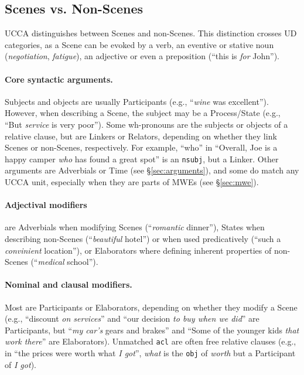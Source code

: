 \documentclass[11pt,a4paper]{article}
\begin{document}
\subsection{Scenes vs. Non-Scenes}\label{sec:s}

UCCA distinguishes between Scenes and non-Scenes.
This distinction crosses UD categories,
as a Scene can be evoked by a verb, an eventive or stative
noun (\textit{negotiation}, \textit{fatigue}),
an adjective or even a preposition (``this is \textit{for} John'').

\paragraph{Core syntactic arguments.}
      Subjects and objects are usually Participants (e.g., ``\textit{wine} was excellent'').
      However, when describing a Scene, the subject may be a Process/State
      (e.g., ``But \textit{service} is very poor'').
      Some wh-pronouns are the subjects or objects of a relative clause, but
      are Linkers or Relators,
      depending on whether they link Scenes or non-Scenes, respectively.
      For example, ``who'' in ``Overall, Joe is a happy camper \textit{who} has found a great spot'' is an \texttt{nsubj}, but a Linker.
      Other arguments are Adverbials or Time (see \S\ref{sec:arguments}), and
      some do match any UCCA unit, especially when they are parts of MWEs (see \S\ref{sec:mwe}).

\paragraph{Adjectival modifiers} are Adverbials when modifying Scenes
    (``\textit{romantic} dinner''), States when describing non-Scenes (``\textit{beautiful} hotel'') 
    or when used predicatively (``such a \textit{convinient} location''), or
    Elaborators where defining inherent properties of non-Scenes (``\textit{medical} school'').

\paragraph{Nominal and clausal modifiers.}
    Most are Participants or Elaborators,
    depending on whether they modify a Scene (e.g.,
    ``discount \textit{on services}'' and
    ``our decision \textit{to buy when we did}'' are Participants,
    but ``\textit{my car's} gears and brakes'' and ``Some of the younger kids \textit{that work there}'' are Elaborators).
    Unmatched \texttt{acl} are often
    free relative clauses (e.g., in ``the prices were worth what \textit{I got}'',
    \textit{what} is the \texttt{obj} of \textit{worth} but
    a Participant of \textit{I got}).
\end{document}
